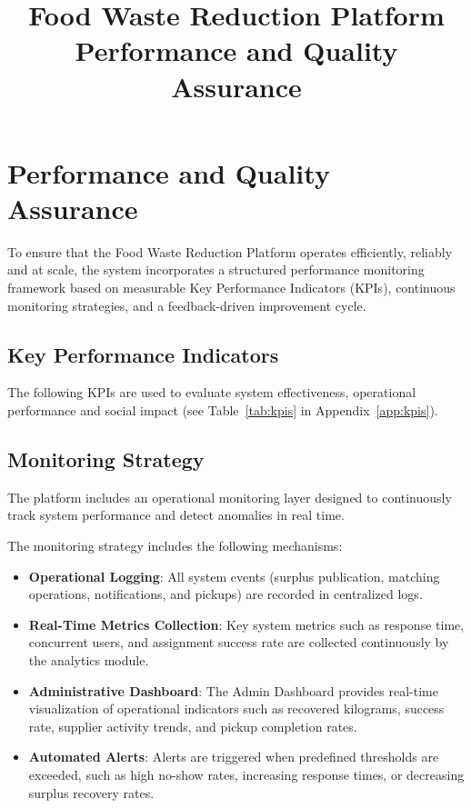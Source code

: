\documentclass[12pt]{article}
\title{Food Waste Reduction Platform\\Performance and Quality Assurance}
\date{}
\begin{document}
\maketitle

\section{Performance and Quality Assurance}

To ensure that the Food Waste Reduction Platform operates efficiently, reliably and at scale, the system incorporates a structured performance monitoring framework based on measurable Key Performance Indicators (KPIs), continuous monitoring strategies, and a feedback-driven improvement cycle.

\subsection{Key Performance Indicators}

The following KPIs are used to evaluate system effectiveness, operational
performance and social impact (see Table~\ref{tab:kpis} in Appendix~\ref{app:kpis}).

\subsection{Monitoring Strategy}

The platform includes an operational monitoring layer designed to continuously track system performance and detect anomalies in real time.

The monitoring strategy includes the following mechanisms:

\begin{itemize}
    \item \textbf{Operational Logging}: All system events (surplus publication, matching operations, notifications, and pickups) are recorded in centralized logs.
    
    \item \textbf{Real-Time Metrics Collection}: Key system metrics such as response time, concurrent users, and assignment success rate are collected continuously by the analytics module.
    
    \item \textbf{Administrative Dashboard}: The Admin Dashboard provides real-time visualization of operational indicators such as recovered kilograms, success rate, supplier activity trends, and pickup completion rates.
    
    \item \textbf{Automated Alerts}: Alerts are triggered when predefined thresholds are exceeded, such as high no-show rates, increasing response times, or decreasing surplus recovery rates.
\end{itemize}
\end{document}
